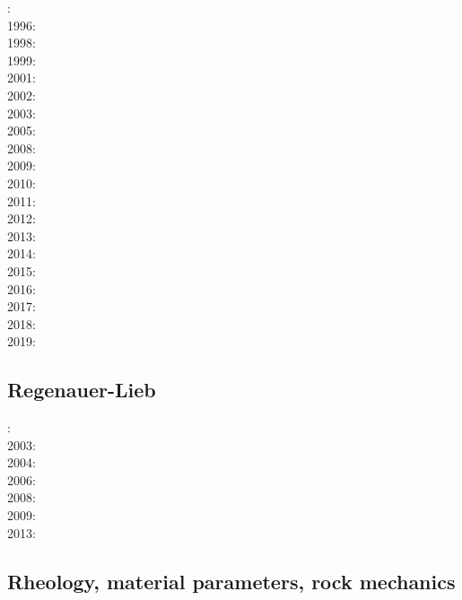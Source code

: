 : \cite{rich94}\cite{fari94}\\
1996: \cite{zhgm96}\\
1998: \cite{bisp98}\cite{most98}\\
1999: \cite{most99}\\
2001: \cite{vapy01}\\
2002: \cite{foul02}\\
2003: \cite{vazh03}\\
2005: \cite{bugu05}\cite{fasa05}\\
2008: \cite{uegs08}\cite{slee08}\\
2009: \cite{bucl09}\cite{zhgy09}\cite{baiv10}\cite{tabs09}\cite{maml09}\\
2010: \cite{fabl10}\\
2011: \cite{sosk11}\cite{vasd11}\\
2012: \cite{huco12}\\
2013: \cite{bemm12}\cite{brps13}\\
2014: \cite{buge14}\cite{gery14b}\cite{buto14}\cite{buit14}\cite{leli14}\\
2015: \cite{bemm15}\cite{gesb15}\cite{kocb15}\cite{meds15}\cite{lile15}\\
2016: \cite{fige16}\cite{gadb16}\cite{kobc16}\\
2017: \cite{bahf17}\cite{brsg17}\cite{bahf17}\cite{bekb17}\cite{kocb17}\\
2018: \cite{daga18}\\
2019: \cite{kobg19}

\subsection*{Regenauer-Lieb}

: \cite{reyu00}\\
2003: \cite{reyu03}\\
2004: \cite{reyu04}\\
2006: \cite{rehy06}\cite{rewr06}\\
2008: \cite{rerw08}\\
2009: \cite{reps09}\\
2013: \cite{revp13}

\subsection*{Rheology, material parameters, rock mechanics}

